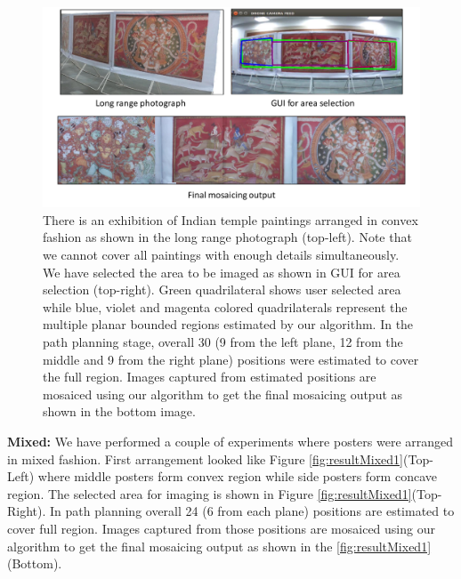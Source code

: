 \begin{figure}[t!]
\centering
\includegraphics[width=\linewidth]{figures/multiplanar/convexResult.pdf}
\caption[Result: Convex arrangement]{There is an exhibition of Indian temple
paintings arranged in convex fashion as shown in the long range photograph (top-left). Note that we
cannot cover all paintings with enough details simultaneously. We have selected
the area to be imaged as shown in GUI for area selection (top-right).
Green quadrilateral shows user selected area while blue, violet and magenta
colored quadrilaterals represent the multiple planar bounded regions
estimated by our algorithm. In the path planning stage, overall 30 (9 from the left
plane, 12 from the middle and 9 from the right plane) positions were estimated to cover
the full region. Images captured from estimated positions are mosaiced using our
algorithm to get the final mosaicing output as shown in the bottom image.}
\label{fig:resultConvex}
\end{figure}

\textbf{Mixed:} We have performed a couple of experiments where posters were
arranged in mixed fashion. First arrangement looked like Figure
\ref{fig:resultMixed1}(Top-Left) where middle posters form convex region while
side posters form concave region. The selected area for imaging is shown in
Figure \ref{fig:resultMixed1}(Top-Right). In path planning overall 24 (6 from each
plane) positions are estimated to cover full region. Images captured from
those positions are mosaiced using our algorithm to get the final mosaicing
output as shown in the \ref{fig:resultMixed1}(Bottom).


